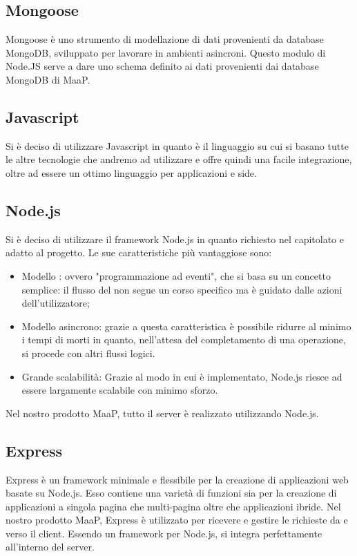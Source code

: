 \subsection{Mongoose}
Mongoose è uno strumento di modellazione di dati provenienti da database MongoDB, sviluppato per lavorare in ambienti asincroni.
Questo modulo di Node.JS serve a dare uno schema definito ai dati provenienti dai database MongoDB di MaaP.

\subsection{Javascript}
Si è deciso di utilizzare Javascript in quanto è il linguaggio su cui si basano tutte le altre tecnologie che andremo ad utilizzare e 
offre quindi una facile integrazione, oltre ad essere un ottimo linguaggio per applicazioni  e  side.

\subsection{Node.js}
Si è deciso di utilizzare il framework Node.js in quanto richiesto nel capitolato e adatto al progetto. 
Le sue caratteristiche più vantaggiose sono:
\begin{itemize}
\item Modello : ovvero "programmazione ad eventi", che si basa su un concetto semplice: il flusso del  non segue un corso specifico ma è guidato dalle azioni dell'utilizzatore;
\item Modello asincrono: grazie a questa caratteristica è possibile ridurre al minimo i tempi di morti in quanto, nell'attesa del completamento di una operazione, si procede con altri flussi logici.
\item Grande scalabilità: Grazie al modo in cui è implementato, Node.js riesce ad essere largamente scalabile con minimo sforzo.
\end{itemize}
Nel nostro prodotto MaaP, tutto il server è realizzato utilizzando Node.js.

\subsection{Express}
Express è un framework minimale e flessibile per la creazione di applicazioni web basate su Node.js. Esso contiene una varietà di funzioni sia per la creazione di applicazioni a singola pagina che multi-pagina oltre che applicazioni ibride.
Nel nostro prodotto MaaP, Express è utilizzato per ricevere e gestire le richieste da e verso il client. Essendo un framework per Node.js, si integra perfettamente all'interno del server.

